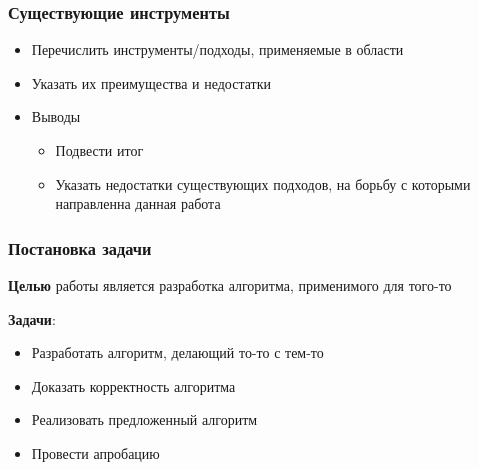 \documentclass{beamer}
\begin{document}
\begin{frame}  
  \frametitle{Существующие инструменты}
  \begin{itemize}
    \item Перечислить инструменты/подходы, применяемые в области
    \item Указать их преимущества и недостатки
  \end{itemize}
  
  \begin{itemize}
    \item Выводы
    \begin{itemize}
      \item Подвести итог
      \item Указать недостатки существующих подходов, на борьбу с которыми 
направленна данная работа
    \end{itemize}
  \end{itemize}
\end{frame}

\begin{frame}
  \frametitle{Постановка задачи}
  \textbf{Целью} работы является разработка алгоритма, применимого для того-то  

  \textbf{Задачи}:
  \begin{itemize}
    \item Разработать алгоритм, делающий то-то с тем-то
    \item Доказать корректность алгоритма
    \item Реализовать предложенный алгоритм
    \item Провести апробацию
  \end{itemize}
\end{frame}
            
\end{document}
